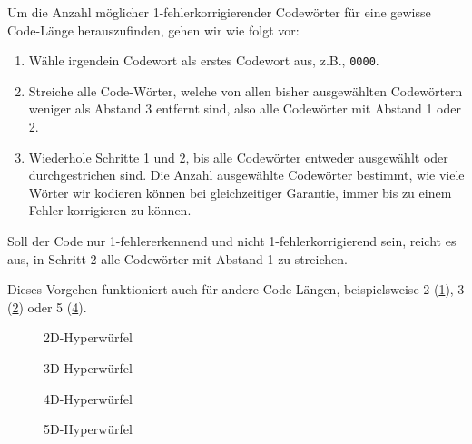 \begin{mydefinition}
Um die Anzahl möglicher 1-fehlerkorrigierender Codewörter für eine gewisse Code-Länge herauszufinden, gehen wir wie folgt vor:
\begin{enumerate}
\item Wähle irgendein Codewort als erstes Codewort aus, z.B., \texttt{0000}.
\item Streiche alle Code-Wörter, welche von allen bisher ausgewählten Codewörtern weniger als Abstand 3 entfernt sind, also alle Codewörter mit Abstand 1 oder 2.
\item Wiederhole Schritte 1 und 2, bis alle Codewörter entweder ausgewählt oder durchgestrichen sind. Die Anzahl ausgewählte Codewörter bestimmt, wie viele Wörter wir kodieren können bei gleichzeitiger Garantie, immer bis zu einem Fehler korrigieren zu können.
\end{enumerate}
Soll der Code nur 1-fehlererkennend und nicht 1-fehlerkorrigierend sein, reicht es aus, in Schritt 2 alle Codewörter mit Abstand 1 zu streichen.

Dieses Vorgehen funktioniert auch für andere Code-Längen, beispielsweise 2 (\cref{fig:2d}), 3 (\cref{fig:3d}) oder 5 (\cref{fig:5d}).
\end{mydefinition}

\begin{figure}[H]
\centering
{}
\caption{2D-Hyperwürfel}
\label{fig:2d}
\end{figure}

\begin{figure}[H]
\centering
{}
\caption{3D-Hyperwürfel}
\label{fig:3d}
\end{figure}

\begin{figure}[H]
\centering
{}
\caption{4D-Hyperwürfel}
\label{fig:4d}
\end{figure}

\begin{figure}[H]
\centering
{}
\caption{5D-Hyperwürfel}
\label{fig:5d}
\end{figure}

